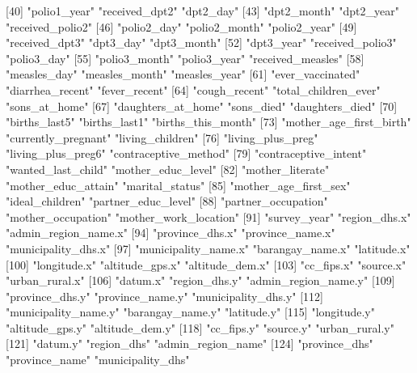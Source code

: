  [40] "polio1_year"               "received_dpt2"             "dpt2_day"                 
 [43] "dpt2_month"                "dpt2_year"                 "received_polio2"          
 [46] "polio2_day"                "polio2_month"              "polio2_year"              
 [49] "received_dpt3"             "dpt3_day"                  "dpt3_month"               
 [52] "dpt3_year"                 "received_polio3"           "polio3_day"               
 [55] "polio3_month"              "polio3_year"               "received_measles"         
 [58] "measles_day"               "measles_month"             "measles_year"             
 [61] "ever_vaccinated"           "diarrhea_recent"           "fever_recent"             
 [64] "cough_recent"              "total_children_ever"       "sons_at_home"             
 [67] "daughters_at_home"         "sons_died"                 "daughters_died"           
 [70] "births_last5"              "births_last1"              "births_this_month"        
 [73] "mother_age_first_birth"    "currently_pregnant"        "living_children"          
 [76] "living_plus_preg"          "living_plus_preg6"         "contraceptive_method"     
 [79] "contraceptive_intent"      "wanted_last_child"         "mother_educ_level"        
 [82] "mother_literate"           "mother_educ_attain"        "marital_status"           
 [85] "mother_age_first_sex"      "ideal_children"            "partner_educ_level"       
 [88] "partner_occupation"        "mother_occupation"         "mother_work_location"     
 [91] "survey_year"               "region_dhs.x"              "admin_region_name.x"      
 [94] "province_dhs.x"            "province_name.x"           "municipality_dhs.x"       
 [97] "municipality_name.x"       "barangay_name.x"           "latitude.x"               
[100] "longitude.x"               "altitude_gps.x"            "altitude_dem.x"           
[103] "cc_fips.x"                 "source.x"                  "urban_rural.x"            
[106] "datum.x"                   "region_dhs.y"              "admin_region_name.y"      
[109] "province_dhs.y"            "province_name.y"           "municipality_dhs.y"       
[112] "municipality_name.y"       "barangay_name.y"           "latitude.y"               
[115] "longitude.y"               "altitude_gps.y"            "altitude_dem.y"           
[118] "cc_fips.y"                 "source.y"                  "urban_rural.y"            
[121] "datum.y"                   "region_dhs"                "admin_region_name"        
[124] "province_dhs"              "province_name"             "municipality_dhs"         
